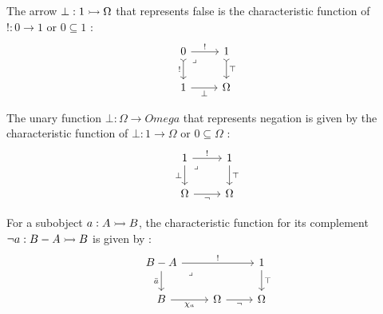 \begin{definition}[False]
  The arrow $\bot: 1 \rightarrowtail \Omega$ that represents false is the characteristic
  function of $!: 0 \to 1$ or $0 \subseteq 1$
  \parencite[p.~117]{goldblatt:topoi}:
  \[\begin{tikzcd}[ampersand replacement=\&]
    0 \& 1 \\
    1 \& \Omega
    \arrow["{\mathrm{\top}}", tail, from=1-2, to=2-2]
    \arrow["{!}", from=1-1, to=1-2]
    \arrow["{!}"', tail, from=1-1, to=2-1]
    \arrow["\bot"', from=2-1, to=2-2]
    \arrow["\lrcorner"{anchor=center, pos=0.125}, draw=none, from=1-1, to=2-2]
  \end{tikzcd}\]
\end{definition}

\begin{definition}[Negation]
  The unary function $\bot: \Omega\to Omega$ that represents negation is given
  by the characteristic function of $\bot: 1 \to \Omega$ or $0 \subseteq \Omega$
  \parencite[p.~137]{goldblatt:topoi}:
  \[\begin{tikzcd}[ampersand replacement=\&]
    1 \& 1 \\
    \Omega \& \Omega
    \arrow["\top", from=1-2, to=2-2]
    \arrow["\bot"', from=1-1, to=2-1]
    \arrow["\neg"', from=2-1, to=2-2]
    \arrow["{!}", from=1-1, to=1-2]
    \arrow["\lrcorner"{anchor=center, pos=0.125}, draw=none, from=1-1, to=2-2]
  \end{tikzcd}\]
\end{definition}

\begin{definition}[Complement]
  For a subobject $a: A\rightarrowtail B$, the characteristic function for its complement
  $\neg a:B-A\rightarrowtail B$ is given by \parencite[p.~146]{goldblatt:topoi}:
  \[\begin{tikzcd}[ampersand replacement=\&]
    {B-A} \&\& 1 \\
    B \& \Omega \& \Omega
    \arrow["\top", from=1-3, to=2-3]
    \arrow["{\bar{a}}"', from=1-1, to=2-1]
    \arrow["{!}", from=1-1, to=1-3]
    \arrow["{\chi_a}"', from=2-1, to=2-2]
    \arrow["\neg"', from=2-2, to=2-3]
    \arrow["\lrcorner"{anchor=center, pos=0.125}, draw=none, from=1-1, to=2-3]
  \end{tikzcd}\]
\end{definition}


